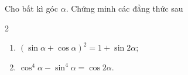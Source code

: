 \begin{bt}%

Cho bất kì góc $\alpha$. Chứng minh các đẳng thức sau
\begin{multicols}{2}
	\begin{enumerate}
		\item $\left(\sin \alpha+\cos\alpha\right)^2=1+\sin 2\alpha$;
		\item $\cos^4\alpha-\sin^4\alpha=\cos 2\alpha$.
	\end{enumerate}
\end{multicols}
\end{bt}

